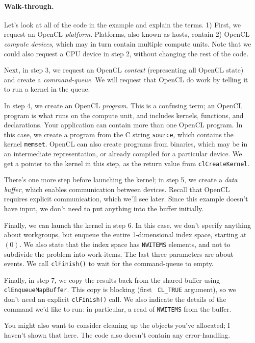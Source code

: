 \paragraph{Walk-through.} Let's look at all of the code in the example and
explain the terms. 1) First, we request an OpenCL \emph{platform}.
Platforms, also known as hosts, contain 2) OpenCL \emph{compute devices},
which may in turn contain multiple compute units. Note that we could
also request a CPU device in step 2, without changing the rest of the code.

Next, in step 3, we request an OpenCL \emph{context} (representing all
OpenCL state) and create a \emph{command-queue}. We will request that
OpenCL do work by telling it to run a kernel in the queue.

In step 4, we create an OpenCL \emph{program}. This is a confusing
term; an OpenCL program is what runs on the compute unit, and includes
kernels, functions, and declarations. Your application can contain
more than one OpenCL program. In this case, we create a program
from the C string {\tt source}, which contains the kernel
{\tt memset}. OpenCL can also create programs from binaries, which may be
in an intermediate representation, or already compiled for a particular
device. We get a pointer to the kernel in this step, as the return
value from {\tt clCreateKernel}.

There's one more step before launching the kernel; in step 5, we
create a \emph{data buffer}, which enables communication between
devices. Recall that OpenCL requires explicit communication,
which we'll see later. Since this example doesn't have input, we 
don't need to put anything into the buffer initially.

Finally, we can launch the kernel in step 6. In this case, we don't
specify anything about workgroups, but enqueue the entire
1-dimensional index space, starting at $(0)$. We also state that the
index space has {\tt NWITEMS} elements, and not to subdivide the
problem into work-items. The last three parameters are about events.
We call {\tt clFinish()} to wait for the command-queue to empty.

Finally, in step 7, we copy the results back from the shared buffer
using {\tt clEnqueueMapBuffer}. This copy is blocking (first {\tt
  CL\_TRUE} argument), so we don't need an explicit {\tt clFinish()}
call. We also indicate the details of the command we'd like to
run: in particular, a read of {\tt NWITEMS} from the buffer.

You might also want to consider cleaning up the objects you've
allocated; I haven't shown that here. The code also doesn't contain
any error-handling.

